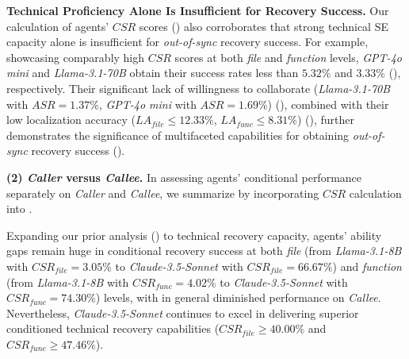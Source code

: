 \textbf{Technical Proficiency Alone Is Insufficient for Recovery Success.}
Our calculation of agents' $CSR$ scores () also corroborates that strong technical SE capacity alone is insufficient for \textit{out-of-sync} recovery success.
For example, showcasing comparably high $CSR$ scores at both \textit{file} and \textit{function} levels, \textit{GPT-4o mini} and \textit{Llama-3.1-70B} obtain their success rates less than $5.32\%$ and $3.33\%$ (), respectively.
Their significant lack of willingness to collaborate (\textit{Llama-3.1-70B} with $ASR=1.37\%$, \textit{GPT-4o mini} with $ASR=1.69\%$) (), combined with their low localization accuracy ($LA_{file} \leq 12.33\%$, $LA_{func} \leq 8.31\%$) (), further demonstrates the significance of multifaceted capabilities for obtaining \textit{out-of-sync} recovery success ().



\textbf{(2) \textit{Caller} versus \textit{Callee}.}
In assessing agents' conditional performance separately on \textit{Caller} and \textit{Callee}, we summarize  by incorporating $CSR$ calculation into .

Expanding our prior analysis () to technical recovery capacity, agents' ability gaps remain huge in conditional recovery success at both \textit{file} (from \textit{Llama-3.1-8B} with $CSR_{file}=3.05\%$ to \textit{Claude-3.5-Sonnet} with $CSR_{file}=66.67\%$) and \textit{function} (from \textit{Llama-3.1-8B} with $CSR_{func}=4.02\%$ to \textit{Claude-3.5-Sonnet} with $CSR_{func}=74.30\%$) levels, with in general diminished performance on \textit{Callee}.
Nevertheless, \textit{Claude-3.5-Sonnet} continues to excel in delivering superior conditioned technical recovery capabilities ($CSR_{file} \geq 40.00 \%$ and $CSR_{func} \geq 47.46\%$).


